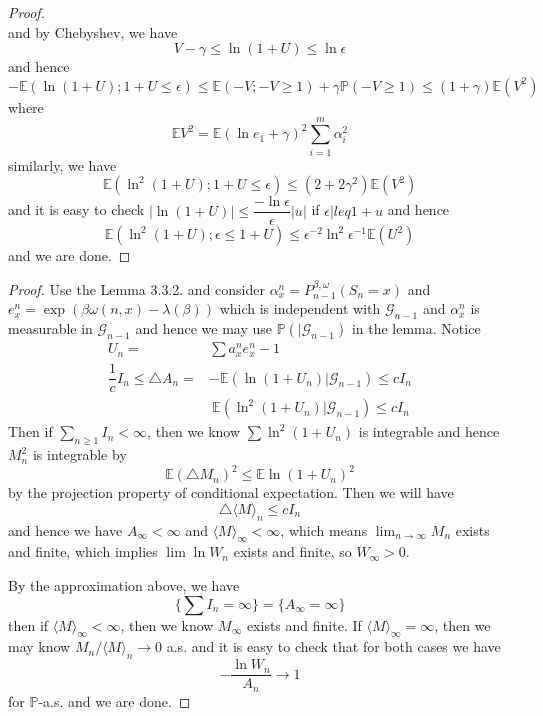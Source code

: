 \begin{proof}
\[    \]
    and by Chebyshev, we have
    \[
    V - \gamma \leq \ln(1+U) \leq \ln \epsilon
    \]
    and hence
    \[
    -\mathbb{E}(\ln(1+U);1+U\leq \epsilon) \leq \mathbb{E}(-V; -V \geq 1) + \gamma\mathbb{P}(-V\geq 1) \leq (1+\gamma)\mathbb{E}(V^2)
    \]
    where
    \[
    \mathbb{E}V^2 = \mathbb{E}(\ln e_1+\gamma)^2 \sum\limits_{i=1}^m \alpha_i^2
    \]
    similarly, we have
    \[
    \mathbb{E}(\ln^2(1+U); 1+U\leq \epsilon) \leq (2+2\gamma^2)\mathbb{E}(V^2)
    \]
    and it is easy to check $|\ln(1+U)| \leq \dfrac{-\ln\epsilon}{\epsilon}|u|$ if $\epsilon |leq 1+u$ and hence
    \[
    \mathbb{E}(\ln^2(1+U); \epsilon \leq 1+U) \leq \epsilon^{-2}\ln^2{\epsilon^{-1}}\mathbb{E}(U^2)
    \]
    and we are done.
\end{proof}

\begin{proof}
    Use the Lemma 3.3.2. and consider $\alpha^n_x = P_{n-1}^{\beta, \omega}(S_n = x)$ and $e_x^n = \exp(\beta\omega(n,x) - \lambda(\beta))$ which is independent with $\mathcal{G}_{n-1}$ and $\alpha_x^n$ is measurable in $\mathcal{G}_{n-1}$ and hence we may use $\mathbb{P}(|\mathcal{G}_{n-1})$ in the lemma. Notice
    \[
    \begin{aligned}
        U_n = &\sum a^n_x e^n_x - 1 \\
        \dfrac{1}{c}I_n \leq \triangle A_n = &-\mathbb{E}(\ln(1+U_n)|\mathcal{G}_{n-1}) \leq cI_n \\
        &\ \mathbb{E}(\ln^2(1+U_n)|\mathcal{G}_{n-1}) \leq cI_n
    \end{aligned}
    \]
    Then if $\sum\limits_{n\geq 1} I_n < \infty$, then we know $\sum\ln^2(1+U_n)$ is integrable and hence $M_n^2$ is integrable by
    \[
    \mathbb{E}(\triangle M_n)^2 \leq \mathbb{E}\ln(1+U_n)^2
    \]
    by the projection property of conditional expectation. Then we will have
    \[
    \triangle \langle M\rangle_n \leq cI_n
    \]
    and hence we have $A_{\infty} < \infty$ and $\langle M \rangle_{\infty} < \infty$, which means $\lim_{n\to\infty} M_n$ exists and finite, which implies $\lim \ln W_n$ exists and finite, so $W_{\infty} > 0$.\par
    By the approximation above, we have
    \[
    \{\sum I_n = \infty\} = \{A_{\infty} = \infty\}
    \]
    then if $\langle M \rangle_{\infty} < \infty$, then we know $M_{\infty}$ exists and finite. If $\langle M\rangle_{\infty} = \infty$, then we may know $M_n/\langle M\rangle_n \to 0$ a.s. and it is easy to check that for both cases we have
    \[-\dfrac{\ln W_n}{A_n} \to 1\]
    for $\mathbb{P}$-a.s. and we are done.
\end{proof}

